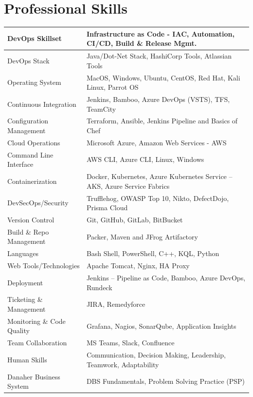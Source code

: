 \documentclass[12pt, a4paper]{article}
\begin{document}
\section*{Professional Skills}
\noindent\begin{tabular}{|p{1.8in}|p{5.15in}|}
\hline
DevOps Skillset & Infrastructure as Code - IAC, Automation, CI/CD, Build \& Release Mgmt. \\
\hline
DevOps Stack & Java/Dot-Net Stack, HashiCorp Tools, Atlassian Tools \\
\hline
Operating System & MacOS, Windows, Ubuntu, CentOS, Red Hat, Kali Linux, Parrot OS \\
\hline
Continuous Integration & Jenkins, Bamboo, Azure DevOps (VSTS), TFS, TeamCity \\
\hline
Configuration Management 	& Terraform, Ansible, Jenkins Pipeline and Basics of Chef \\
\hline
Cloud Operations 	& Microsoft Azure, Amazon Web Services - AWS \\
\hline
Command Line Interface & AWS CLI, Azure CLI, Linux, Windows \\
\hline
Containerization  & Docker, Kubernetes, Azure Kubernetes Service – AKS, Azure Service Fabrics \\
\hline
DevSecOps/Security & Trufflehog, OWASP Top 10, Nikto, DefectDojo, Prisma Cloud \\
\hline
Version Control & Git, GitHub, GitLab, BitBucket \\
\hline
Build \& Repo Management  & Packer, Maven and JFrog Artifactory \\
\hline
Languages	 & Bash Shell, PowerShell, C++, KQL, Python \\
\hline
Web Tools/Technologies  & Apache Tomcat, Nginx, HA Proxy \\
\hline
Deployment & Jenkins – Pipeline as Code, Bamboo, Azure DevOps, Rundeck \\
\hline
Ticketing \& Management  & JIRA, Remedyforce \\
\hline
Monitoring \& Code Quality	 & Grafana, Nagios, SonarQube, Application Insights \\
\hline
Team Collaboration & MS Teams, Slack, Confluence \\
\hline
Human Skills & Communication, Decision Making, Leadership, Teamwork, Adaptability \\
\hline
Danaher Business System &	DBS Fundamentals, Problem Solving Practice (PSP)\\
\hline
\end{tabular}
\end{document}
